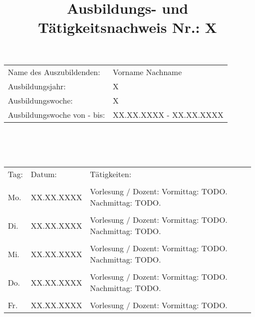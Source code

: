 \documentclass[10pt,a4paper]{article}
\author{}
\date{}
\title{Ausbildungs- und Tätigkeitsnachweis Nr.: X}
\begin{document}
\maketitle
%
%
\begin{tabular}{l|l}
  Name des Auszubildenden: & Vorname Nachname\\
  Ausbildungsjahr: & X\\
  Ausbildungswoche: & X\\
  Ausbildungswoche von - bis: & XX.XX.XXXX - XX.XX.XXXX\\
\end{tabular}
\\
\\\\
%
%
\begin{tabular}{l l p{9cm} l}
  Tag: &  Datum: &  Tätigkeiten:\\
  \firsthline\\
  Mo. & XX.XX.XXXX & Vorlesung / Dozent:\newline
    Vormittag: TODO.\newline
    Nachmittag: TODO.\\\\
  Di. & XX.XX.XXXX & Vorlesung / Dozent:\newline
    Vormittag: TODO.\newline
    Nachmittag: TODO.\\\\
  Mi. & XX.XX.XXXX & Vorlesung / Dozent:\newline
    Vormittag: TODO.\newline
    Nachmittag: TODO.\\\\
  Do. & XX.XX.XXXX & Vorlesung / Dozent:\newline
    Vormittag: TODO.\newline
    Nachmittag: TODO.\\\\
  Fr. & XX.XX.XXXX & Vorlesung / Dozent:\newline
    Vormittag: TODO.\\
\end{tabular}
\end{document}
